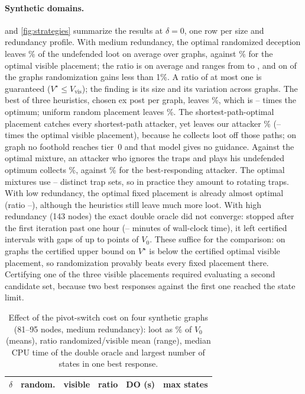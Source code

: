 \documentclass[runningheads]{llncs}
\begin{document}
\paragraph{Synthetic domains.}
 and \cref{fig:strategies} summarize the results at $\delta=0$, one row per size and redundancy profile. With medium redundancy, the optimal randomized deception leaves \MixMean\% of the undefended loot on average over \NMain{} graphs, against \VisMean\% for the optimal visible placement; the ratio is \RatioMean{} on average and ranges from \RatioMin{} to \RatioMax{}, and on \NRatioOne{} of the \NMain{} graphs randomization gains less than 1\%. A ratio of at most one is guaranteed ($V^\star\le V_{\mathrm{vis}}$); the finding is its size and its variation across graphs. The best of three heuristics, chosen ex post per graph, leaves \HeurMean\%, which is \HeurOverMixMin--\HeurOverMixMax{} times the optimum; uniform random placement leaves \UnifMean\%. The shortest-path-optimal placement catches every shortest-path attacker, yet leaves our attacker \SpMean\% (\SpOverVisMin--\SpOverVisMax{} times the optimal visible placement), because he collects loot off those paths; on \SpNoGuide{} graph no foothold reaches tier~0 and that model gives no guidance. Against the optimal mixture, an attacker who ignores the traps and plays his undefended optimum collects \NaiveMean\%, against \MixMean\% for the best-responding attacker. The optimal mixtures use \SuppMin--\SuppMax{} distinct trap sets, so in practice they amount to rotating traps. With low redundancy, the optimal fixed placement is already almost optimal (ratio \LowRatioMin--\LowRatioMax), although the heuristics still leave much more loot. With high redundancy (143 nodes) the exact double oracle did not converge: stopped after the first iteration past one hour (\AltaTmin--\AltaTmax{} minutes of wall-clock time), it left certified intervals with gaps of up to \AltaGapMax{} points of $V_0$. These suffice for the comparison: on \AltaWinsText{} graphs the certified upper bound on $V^\star$ is below the certified optimal visible placement, so randomization provably beats every fixed placement there. Certifying one of the three visible placements required evaluating a second candidate set, because two best responses against the first one reached the state limit.

\begin{table}[t]
\centering
\caption{Effect of the pivot-switch cost on four synthetic graphs (81--95 nodes, medium redundancy): loot as \% of $V_0$ (means), ratio randomized/visible mean (range), median CPU time of the double oracle and largest number of states in one best response.}\label{tab:delta}
\small\setlength{\tabcolsep}{4pt}
\begin{tabular}{lrrcrr}
\toprule
$\delta$ & random. & visible & ratio & DO (s) & max states\\
\midrule
\end{tabular}
\end{table}
\end{document}
